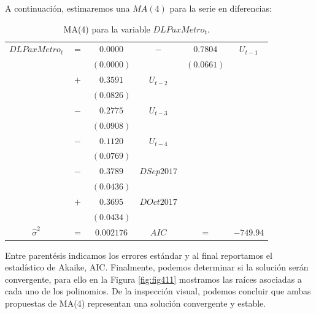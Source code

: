 \documentclass[
]{book}
\begin{document}
A continuación, estimaremos una \(MA(4)\) para la serie en diferencias:

\begin{longtable}[]{@{}cccccc@{}}
\caption{\label{tab:MA04} MA(4) para la variable \(DLPaxMetro_t\).}\tabularnewline
\toprule\noalign{}
\endfirsthead
\endhead
\bottomrule\noalign{}
\endlastfoot
\(DLPaxMetro_t\) & \(=\) & \(0.0000\) & \(-\) & \(0.7804\) & \(U_{t-1}\) \\
& & \((0.0000)\) & & \((0.0661)\) & \\
& \(+\) & \(0.3591\) & \(U_{t-2}\) & & \\
& & \((0.0826)\) & & & \\
& \(-\) & \(0.2775\) & \(U_{t-3}\) & & \\
& & \((0.0908)\) & & & \\
& \(-\) & \(0.1120\) & \(U_{t-4}\) & & \\
& & \((0.0769)\) & & & \\
& \(-\) & \(0.3789\) & \(DSep2017\) & & \\
& & \((0.0436)\) & & & \\
& \(+\) & \(0.3695\) & \(DOct2017\) & & \\
& & \((0.0434)\) & & & \\
\(\hat{\sigma}^2\) & \(=\) & \(0.002176\) & \(AIC\) & \(=\) & \(-749.94\) \\
\end{longtable}

Entre parentésis indicamos los errores estándar y al final reportamos el estadístico de Akaike, AIC. Finalmente, podemos determinar si la solución serán convergente, para ello en la Figura \ref{fig:fig411} mostramos las raíces asociadas a cada uno de los polinomios. De la inspección visual, podemos concluir que ambas propuestas de MA(4) representan una solución convergente y estable.
\end{document}
